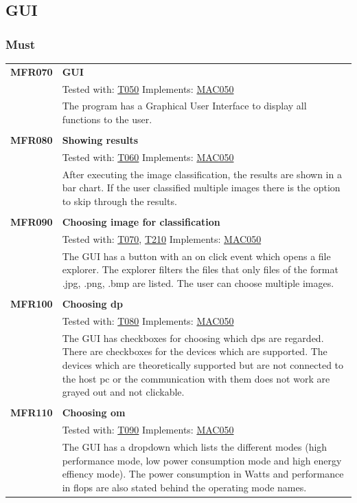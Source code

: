 \documentclass[parskip=full]{scrartcl}
\begin{document}
\subsection{GUI}
\subsubsection{Must}
\begin{tabular}{p{2cm}p{11.4cm}}
\textbf {MFR070} \hypertarget{MFR050}& \textbf{GUI} \\
& Tested with: \hyperlink{T050}{T050} Implements: \hyperlink{MAC050}{MAC050} \\
& The program has a Graphical User Interface to display all functions to the user. \\
& \\
\textbf {MFR080}\hypertarget{MFR060}  & \textbf{Showing results} \\
& Tested with: \hyperlink{T060}{T060} Implements: \hyperlink{MAC050}{MAC050} \\
& After executing the \gls{image classification}, the results are shown in a bar chart. If the user classified multiple images there is the option to skip through the results.\\
& \\
\textbf{MFR090} \hypertarget{MFR070}& \textbf{Choosing image for classification}\\
& Tested with: \hyperlink{T070}{T070}, \hyperlink{T210}{T210} Implements: \hyperlink{MAC050}{MAC050} \\
& The GUI has a button with an on click event which opens a file explorer. The explorer filters the files that only files of the format .jpg, .png, .bmp are listed. The user can choose multiple images.\\
& \\
\textbf{MFR100} \hypertarget{MFR080}& \textbf{Choosing \gls{dp}}\\
& Tested with: \hyperlink{T080}{T080} Implements: \hyperlink{MAC050}{MAC050} \\
& The GUI has checkboxes for choosing which \glspl{dp} are regarded. There are checkboxes for the devices which are supported. The devices which are theoretically supported but are not connected to the \gls{host pc} or the communication with them does not work are grayed out and not clickable. \\
& \\
\textbf{MFR110}\hypertarget{MFR090} & \textbf{Choosing \gls{om}}\\
& Tested with: \hyperlink{T090}{T090} Implements: \hyperlink{MAC050}{MAC050}  \\
& The GUI has a dropdown which lists the different modes (high \gls{performance} mode, low \gls{power consumption} mode and high energy effiency mode). The \gls{power consumption} in Watts and \gls{performance} in \gls{flops} are also stated behind the operating mode names.
\end{tabular}
\end{document}
